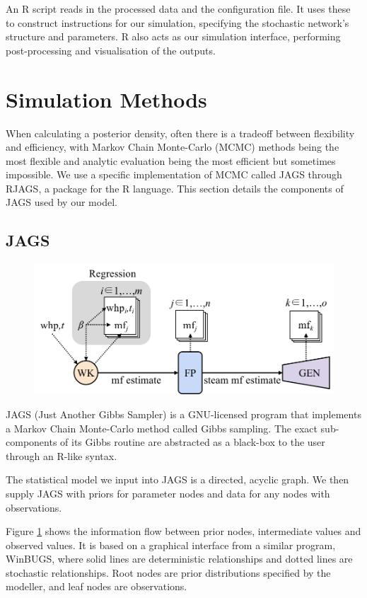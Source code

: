 \documentclass[a4paper, 12pt]{article}
\begin{document}
An R script reads in the processed data and the configuration file. It uses these to construct instructions for our simulation, specifying the stochastic network's structure and parameters. R also acts as our simulation interface, performing post-processing and visualisation of the outputs.

\section{Simulation Methods}
When calculating a posterior density, often there is a tradeoff between flexibility and efficiency, with Markov Chain Monte-Carlo (MCMC) methods being the most flexible and analytic evaluation being the most efficient but sometimes impossible. We use a specific implementation of MCMC called JAGS through RJAGS, a package for the R language. This section details the components of JAGS used by our model.

\subsection{JAGS}

\begin{figure}
  \centering
  \includegraphics[width=0.5\linewidth]{media/jags_diagram}
  \label{fig:jags_diagram}
\end{figure}

JAGS (Just Another Gibbs Sampler) is a GNU-licensed program that implements a Markov Chain Monte-Carlo method called Gibbs sampling. The exact sub-components of its Gibbs routine are abstracted as a black-box to the user through an R-like syntax.

The statistical model we input into JAGS is a directed, acyclic graph. We then supply JAGS with priors for parameter nodes and data for any nodes with observations.

Figure \ref{fig:jags_diagram} shows the information flow between prior nodes, intermediate values and observed values. It is based on a graphical interface from a similar program, WinBUGS, where solid lines are deterministic relationships and dotted lines are stochastic relationships. Root nodes are prior distributions specified by the modeller, and leaf nodes are observations. 
\end{document}
